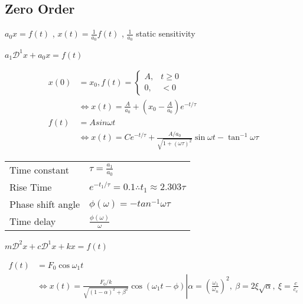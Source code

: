 \documentclass[main.tex]{subfile}
\begin{document}
\tiny
\subsection{Zero Order}
$ a_0x = f(t) $ , $x(t) = \frac{1}{a_0} f(t)$ , $\frac{1}{a_0}$ static sensitivity


$a_1\mathcal{D}^1x + a_0x = f(t)$

\begin{align}
	x(0) &= x_0
	, f(t) = 
	\begin{cases}
		A, & t \geq 0
		\\0, & < 0
	\end{cases}
	\\ & \iff x(t) = \frac{A}{a_0} + (x_0 - \frac{A}{a_0})e^{-t/\tau}
	\\f(t) &= Asin{\omega t}
	\\ & \iff x(t) = Ce^{-t/\tau} + \frac{A/a_0}{\sqrt{1 + (\omega\tau)^2}}
		\sin{\omega t - \tan^{-1}{\omega\tau}}
\end{align}

\begin{table}[H]
  \begin{center}
    \begin{tabular}{ll}
      \\ \toprule
			Time constant & $\tau = \frac{a_1}{a_0}$ 
			\\Rise Time & $e^{-t_1/\tau} = 0.1 \therefore t_1 \approx 2.303\tau$ 
			\\Phase shift angle & $\phi(\omega) = -tan^{-1}{\omega\tau}$
			\\Time delay & $\frac{\phi(\omega)}{\omega}$
      \\ \bottomrule
    \end{tabular}
  \end{center}
\end{table}


$m\mathcal{D}^2x + c\mathcal{D}^1x + kx = f(t)$

\begin{align}
	f(t) &= F_0\cos{\omega_1 t}
	\\ & \iff \left. x(t) = \frac{F_0/k}{\sqrt{(1-\alpha)^2 + \beta^2}} \cos{(\omega_1 t -
			\phi)} \right| \alpha = (\frac{\omega_1}{\omega_n})^2,\ \beta =
	2\xi\sqrt{\alpha},\ \xi = \frac{c}{c_c}
\end{align}
\end{document}
